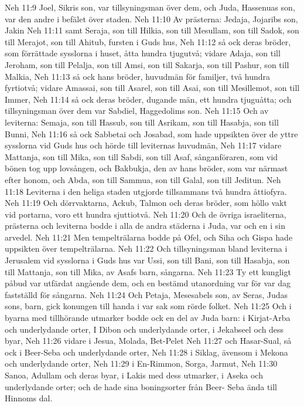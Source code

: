 Neh 11:9  Joel, Sikris son, var tillsyningsman över dem, och Juda, Hassenuas son, var den andre i befälet över staden.
Neh 11:10  Av prästerna: Jedaja, Jojaribs son, Jakin
Neh 11:11  samt Seraja, son till Hilkia, son till Mesullam, son till Sadok, son till Merajot, son till Ahitub, fursten i Guds hus,
Neh 11:12  så ock deras bröder, som förrättade sysslorna i huset, åtta hundra tjugutvå; vidare Adaja, son till Jeroham, son till Pelalja, son till Amsi, son till Sakarja, son till Pashur, son till Malkia,
Neh 11:13  så ock hans bröder, huvudmän för familjer, två hundra fyrtiotvå; vidare Amassai, son till Asarel, son till Asai, son till Mesillemot, son till Immer,
Neh 11:14  så ock deras bröder, dugande män, ett hundra tjuguåtta; och tillsyningsman över dem var Sabdiel, Haggedolims son.
Neh 11:15  Och av leviterna: Semaja, son till Hassub, son till Asrikam, son till Hasabja, son till Bunni,
Neh 11:16  så ock Sabbetai och Josabad, som hade uppsikten över de yttre sysslorna vid Guds hus och hörde till leviternas huvudmän,
Neh 11:17  vidare Mattanja, son till Mika, son till Sabdi, son till Asaf, sånganföraren, som vid bönen tog upp lovsången, och Bakbukja, den av hans bröder, som var närmast efter honom, och Abda, son till Sammua, son till Galal, son till Jeditun.
Neh 11:18  Leviterna i den heliga staden utgjorde tillsammans två hundra åttiofyra.
Neh 11:19  Och dörrvaktarna, Ackub, Talmon och deras bröder, som höllo vakt vid portarna, voro ett hundra sjuttiotvå.
Neh 11:20  Och de övriga israeliterna, prästerna och leviterna bodde i alla de andra städerna i Juda, var och en i sin arvedel.
Neh 11:21  Men tempelträlarna bodde på Ofel, och Siha och Gispa hade uppsikten över tempelträlarna.
Neh 11:22  Och tillsyningsman bland leviterna i Jerusalem vid sysslorna i Guds hus var Ussi, son till Bani, son till Hasabja, son till Mattanja, son till Mika, av Asafs barn, sångarna.
Neh 11:23  Ty ett kungligt påbud var utfärdat angående dem, och en bestämd utanordning var för var dag fastställd för sångarna.
Neh 11:24  Och Petaja, Mesesabels son, av Seras, Judas sons, barn, gick konungen till handa i var sak som rörde folket.
Neh 11:25  Och i byarna med tillhörande utmarker bodde ock en del av Juda barn: i Kirjat-Arba och underlydande orter, I Dibon och underlydande orter, i Jekabseel och dess byar,
Neh 11:26  vidare i Jesua, Molada, Bet-Pelet
Neh 11:27  och Hasar-Sual, så ock i Beer-Seba och underlydande orter,
Neh 11:28  i Siklag, ävensom i Mekona och underlydande orter,
Neh 11:29  i En-Rimmon, Sorga, Jarmut,
Neh 11:30  Sanoa, Adullam och deras byar, i Lakis med dess utmarker, i Aseka och underlydande orter; och de hade sina boningsorter från Beer- Seba ända till Hinnoms dal.
